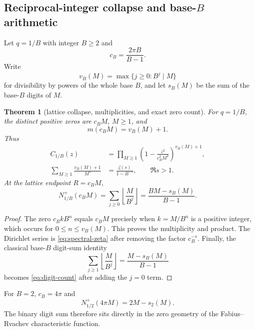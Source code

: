 \documentclass[11pt]{article}
\newtheorem{theorem}{Theorem}[section]
\theoremstyle{definition}
\theoremstyle{remark}
\begin{document}
\subsection{Reciprocal-integer collapse and base-$B$ arithmetic}

Let $q=1/B$ with integer $B\ge2$ and
\begin{equation}\label{eq:cB}
 c_B=\frac{2\pi B}{B-1}.
\end{equation}
Write
\[
 v_B(M)=\max\{j\ge0:B^j\mid M\}
\]
for divisibility by powers of the whole base $B$, and let $s_B(M)$ be the sum of the base-$B$ digits of $M$.

\begin{theorem}[lattice collapse, multiplicities, and exact zero count]\label{thm:digit-zero-count}
For $q=1/B$, the distinct positive zeros are $c_BM$, $M\ge1$, and
\begin{equation}\label{eq:multiplicity-B}
 m(c_BM)=v_B(M)+1.
\end{equation}
Thus
\begin{align}
 C_{1/B}(z)&=\prod_{M\ge1}
 \left(1-\frac{z^2}{c_B^2M^2}\right)^{v_B(M)+1},\label{eq:digit-hadamard}\\
 \sum_{M\ge1}\frac{v_B(M)+1}{M^s}
 &=\frac{\zeta(s)}{1-B^{-s}},\qquad \Re s>1.
 \label{eq:valuation-dirichlet}
\end{align}
At the lattice endpoint $R=c_BM$,
\begin{equation}\label{eq:digit-count}
 \boxed{\quad
 N_{1/B}^+(c_BM)
 =\sum_{j\ge0}\left\lfloor\frac{M}{B^j}\right\rfloor
 =\frac{BM-s_B(M)}{B-1}.
 \quad}
\end{equation}
\end{theorem}

\begin{proof}
The zero $c_BkB^n$ equals $c_BM$ precisely when $k=M/B^n$ is a positive integer, which occurs for $0\le n\le v_B(M)$.  This proves the multiplicity and product.  The Dirichlet series is \cref{eq:spectral-zeta} after removing the factor $c_B^{-s}$.  Finally, the classical base-$B$ digit-sum identity
\[
 \sum_{j\ge1}\left\lfloor\frac{M}{B^j}\right\rfloor
 =\frac{M-s_B(M)}{B-1}
\]
becomes \cref{eq:digit-count} after adding the $j=0$ term.
\end{proof}

For $B=2$, $c_B=4\pi$ and
\begin{equation}\label{eq:binary-zero-count}
 N_{1/2}^+(4\pi M)=2M-s_2(M).
\end{equation}
The binary digit sum therefore sits directly in the zero geometry of the Fabius--Rvachev characteristic function.
\end{document}
